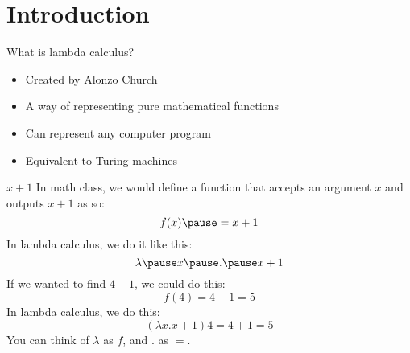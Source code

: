 \section{Introduction}
\begin{namedframe}{What is lambda calculus?}
	\begin{itemize}[<+->]
		\item Created by Alonzo Church
		\item A way of representing \alert{pure} mathematical functions
		\item Can represent any computer program
		\item Equivalent to Turing machines
	\end{itemize}
\end{namedframe}
\begin{namedframe}{$x+1$}
	In math class, we would define a function that accepts an argument $x$ and outputs $x+1$ as so:
	\[f(x) \pause = x + 1\]
	\pause
	In lambda calculus, we do it like this:
	\[\lambda \pause x \pause . \pause x + 1\]
	\pause
	If we wanted to find $4 + 1$, we could do this:
	\[f(4) = 4 + 1 = 5\]
	\pause
	In lambda calculus, we do this:
	\[(\lambda x . x+1) 4 = 4 + 1 = 5\]
	\pause
	You can think of $\lambda$ as $f$, and $.$ as $=$.
\end{namedframe}
